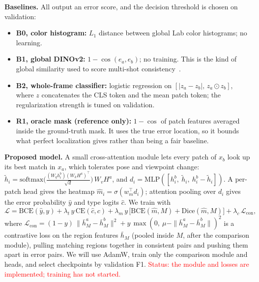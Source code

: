 \documentclass{article}
\newcommand{\XX}[1]{\textcolor{red}{#1}}
\begin{document}
\textbf{Baselines.} All output an error score, and the decision threshold is chosen on validation:
\begin{itemize}
  \item \textbf{B0, color histogram:} $L_1$ distance between global Lab color histograms; no learning.
  \item \textbf{B1, global DINOv2:} $1-\cos(e_a, e_b)$; no training. This is the kind of global
  similarity used to score multi-shot consistency~\cite{atzmon2024motion}.
  \item \textbf{B2, whole-frame classifier:} logistic regression on $[|z_a - z_b|,\, z_a\odot z_b]$,
  where $z$ concatenates the CLS token and the mean patch token; the regularization strength is
  tuned on validation.
  \item \textbf{R1, oracle mask (reference only):} $1-\cos$ of patch features averaged inside the
  ground-truth mask. It uses the true error location, so it bounds what perfect localization gives
  rather than being a fair baseline.
\end{itemize}

\textbf{Proposed model.} A small cross-attention module lets every patch of $x_b$ look up its best
match in $x_a$, which tolerates pose and viewpoint change:
$\tilde h_i = \mathrm{softmax}\!\big(\tfrac{(W_q h^b_i)(W_k H^a)^\top}{\sqrt d}\big)\, W_v H^a$, and
$d_i = \mathrm{MLP}([h^b_i,\ \tilde h_i,\ h^b_i-\tilde h_i])$. A per-patch head gives the heatmap
$\hat m_i=\sigma(w_m^\top d_i)$; attention pooling over $d_i$ gives the error probability $\hat y$ and
type logits $\hat c$. We train with
\begin{equation}
\mathcal{L} = \mathrm{BCE}(\hat y, y) + \lambda_t\, y\,\mathrm{CE}(\hat c, c)
 + \lambda_m\, y\,\big[\mathrm{BCE}(\hat m, M) + \mathrm{Dice}(\hat m, M)\big]
 + \lambda_c\, \mathcal{L}_{\text{con}},
\end{equation}
where $\mathcal{L}_{\text{con}} = (1-y)\,\|\bar h^a_M-\bar h^b_M\|^2 + y\,\max(0,\ \mu - \|\bar h^a_M-\bar h^b_M\|)^2$
is a contrastive loss on the region features $\bar h_M$ (pooled inside $M$, after the comparison
module), pulling matching regions together in consistent pairs and pushing them apart in error pairs.
We will use AdamW, train only the comparison module and heads, and select checkpoints by validation F1.
\XX{Status: the module and losses are implemented; training has not started.}
\end{document}

